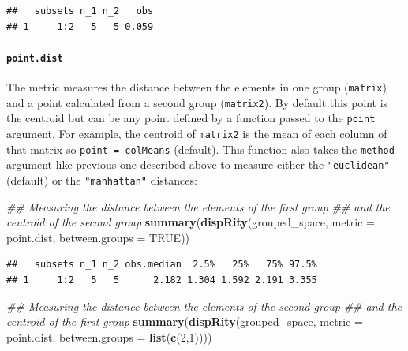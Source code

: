 \documentclass[]{book}
\newenvironment{Shaded}{\begin{snugshade}}{\end{snugshade}}
\newcommand{\CommentTok}[1]{\textcolor[rgb]{0.56,0.35,0.01}{\textit{#1}}}
\newcommand{\DataTypeTok}[1]{\textcolor[rgb]{0.13,0.29,0.53}{#1}}
\newcommand{\DecValTok}[1]{\textcolor[rgb]{0.00,0.00,0.81}{#1}}
\newcommand{\KeywordTok}[1]{\textcolor[rgb]{0.13,0.29,0.53}{\textbf{#1}}}
\newcommand{\NormalTok}[1]{#1}
\newcommand{\OtherTok}[1]{\textcolor[rgb]{0.56,0.35,0.01}{#1}}
\let\oldparagraph\paragraph
\renewcommand{\paragraph}[1]{\oldparagraph{#1}\mbox{}}
\begin{document}
\begin{verbatim}
##   subsets n_1 n_2   obs
## 1     1:2   5   5 0.059
\end{verbatim}

\hypertarget{point.dist}{%
\paragraph{\texorpdfstring{\texttt{point.dist}}{point.dist}}\label{point.dist}}

The metric measures the distance between the elements in one group (\texttt{matrix}) and a point calculated from a second group (\texttt{matrix2}).
By default this point is the centroid but can be any point defined by a function passed to the \texttt{point} argument.
For example, the centroid of \texttt{matrix2} is the mean of each column of that matrix so \texttt{point\ =\ colMeans} (default).
This function also takes the \texttt{method} argument like previous one described above to measure either the \texttt{"euclidean"} (default) or the \texttt{"manhattan"} distances:

\begin{Shaded}
\begin{Highlighting}[]
\CommentTok{## Measuring the distance between the elements of the first group}
\CommentTok{## and the centroid of the second group}
\KeywordTok{summary}\NormalTok{(}\KeywordTok{dispRity}\NormalTok{(grouped_space, }\DataTypeTok{metric =}\NormalTok{ point.dist,}
                 \DataTypeTok{between.groups =} \OtherTok{TRUE}\NormalTok{))}
\end{Highlighting}
\end{Shaded}

\begin{verbatim}
##   subsets n_1 n_2 obs.median  2.5%   25%   75% 97.5%
## 1     1:2   5   5      2.182 1.304 1.592 2.191 3.355
\end{verbatim}

\begin{Shaded}
\begin{Highlighting}[]
\CommentTok{## Measuring the distance between the elements of the second group}
\CommentTok{## and the centroid of the first group}
\KeywordTok{summary}\NormalTok{(}\KeywordTok{dispRity}\NormalTok{(grouped_space, }\DataTypeTok{metric =}\NormalTok{ point.dist,}
                 \DataTypeTok{between.groups =} \KeywordTok{list}\NormalTok{(}\KeywordTok{c}\NormalTok{(}\DecValTok{2}\NormalTok{,}\DecValTok{1}\NormalTok{))))}
\end{Highlighting}
\end{Shaded}
\end{document}
